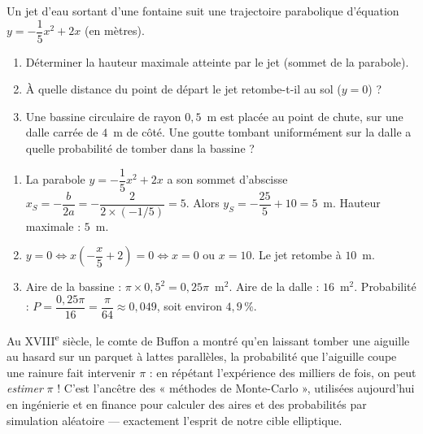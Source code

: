 \documentclass[11pt]{article}
\begin{document}
\begin{exercice}
Un jet d'eau sortant d'une fontaine suit une trajectoire parabolique d'équation $y = -\dfrac{1}{5}x^2 + 2x$ (en mètres). 
\begin{enumerate}
\item Déterminer la hauteur maximale atteinte par le jet (sommet de la parabole).
\item À quelle distance du point de départ le jet retombe-t-il au sol ($y=0$) ?
\item Une bassine circulaire de rayon $0{,}5$~m est placée au point de chute, sur une dalle carrée de $4$~m de côté. Une goutte tombant uniformément sur la dalle a quelle probabilité de tomber dans la bassine ?
\end{enumerate}
\end{exercice}

\begin{corrige}
\begin{enumerate}
\item La parabole $y = -\dfrac{1}{5}x^2+2x$ a son sommet d'abscisse $x_S = -\dfrac{b}{2a} = -\dfrac{2}{2\times(-1/5)} = 5$. Alors $y_S = -\dfrac{25}{5}+10 = 5$~m. Hauteur maximale : $5$~m.
\item $y=0 \iff x\left(-\dfrac{x}{5}+2\right)=0 \iff x=0$ ou $x=10$. Le jet retombe à $10$~m.
\item Aire de la bassine : $\pi \times 0{,}5^2 = 0{,}25\pi$~m$^2$. Aire de la dalle : $16$~m$^2$. Probabilité : $P = \dfrac{0{,}25\pi}{16} = \dfrac{\pi}{64} \approx 0{,}049$, soit environ $4{,}9\,\%$.
\end{enumerate}
\end{corrige}

\begin{savaistu}
Au XVIII\textsuperscript{e} siècle, le comte de Buffon a montré qu'en laissant tomber une aiguille au hasard sur un parquet à lattes parallèles, la probabilité que l'aiguille coupe une rainure fait intervenir $\pi$ : en répétant l'expérience des milliers de fois, on peut \emph{estimer} $\pi$ ! C'est l'ancêtre des « méthodes de Monte-Carlo », utilisées aujourd'hui en ingénierie et en finance pour calculer des aires et des probabilités par simulation aléatoire — exactement l'esprit de notre cible elliptique.
\end{savaistu}
\end{document}

